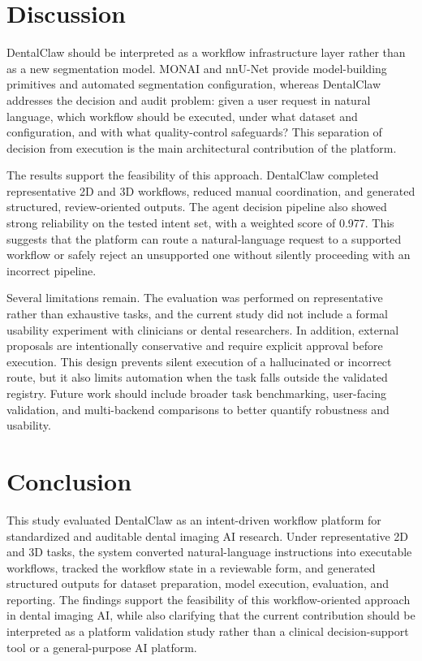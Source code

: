 \documentclass[final,5p,times,twocolumn]{elsarticle}
\begin{document}
\section{Discussion}
DentalClaw should be interpreted as a workflow infrastructure layer rather than as a new segmentation model. MONAI and nnU-Net provide model-building primitives and automated segmentation configuration, whereas DentalClaw addresses the decision and audit problem: given a user request in natural language, which workflow should be executed, under what dataset and configuration, and with what quality-control safeguards? This separation of decision from execution is the main architectural contribution of the platform.

The results support the feasibility of this approach. DentalClaw completed representative 2D and 3D workflows, reduced manual coordination, and generated structured, review-oriented outputs. The agent decision pipeline also showed strong reliability on the tested intent set, with a weighted score of 0.977. This suggests that the platform can route a natural-language request to a supported workflow or safely reject an unsupported one without silently proceeding with an incorrect pipeline.

Several limitations remain. The evaluation was performed on representative rather than exhaustive tasks, and the current study did not include a formal usability experiment with clinicians or dental researchers. In addition, external proposals are intentionally conservative and require explicit approval before execution. This design prevents silent execution of a hallucinated or incorrect route, but it also limits automation when the task falls outside the validated registry. Future work should include broader task benchmarking, user-facing validation, and multi-backend comparisons to better quantify robustness and usability.

\section{Conclusion}
This study evaluated DentalClaw as an intent-driven workflow platform for standardized and auditable dental imaging AI research. Under representative 2D and 3D tasks, the system converted natural-language instructions into executable workflows, tracked the workflow state in a reviewable form, and generated structured outputs for dataset preparation, model execution, evaluation, and reporting. The findings support the feasibility of this workflow-oriented approach in dental imaging AI, while also clarifying that the current contribution should be interpreted as a platform validation study rather than a clinical decision-support tool or a general-purpose AI platform.

\newpage
\footnotesize


\end{document}
